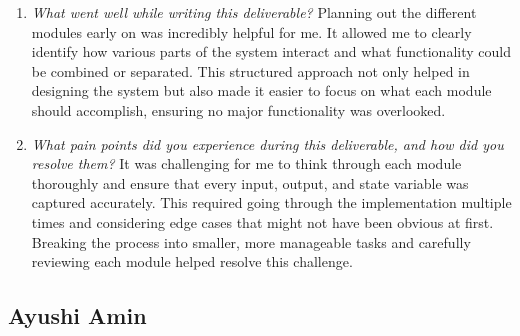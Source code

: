 \documentclass[12pt, titlepage]{article}
\begin{document}
\begin{enumerate}
  \item \textit{What went well while writing this deliverable? }
  Planning out the different modules early on was incredibly helpful for me. It allowed me to clearly identify how various parts of the system interact and what functionality could be combined or separated. This structured approach not only helped in designing the system but also made it easier to focus on what each module should accomplish, ensuring no major functionality was overlooked.

  \item \textit{What pain points did you experience during this deliverable, and how did you resolve them?}
    It was challenging for me to think through each module thoroughly and ensure that every input, output, and state variable was captured accurately. This required going through the implementation multiple times and considering edge cases that might not have been obvious at first. Breaking the process into smaller, more manageable tasks and carefully reviewing each module helped resolve this challenge.

    
\end{enumerate}

\subsection*{Ayushi Amin}
\end{document}
